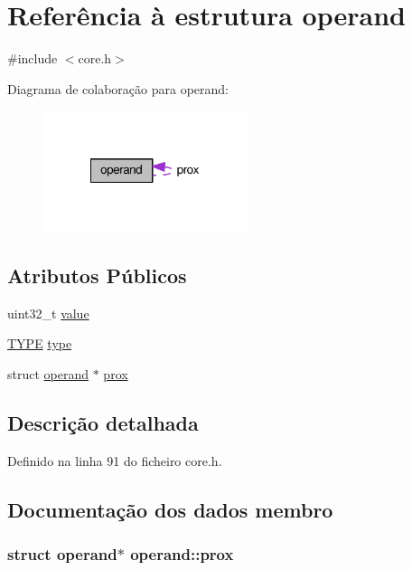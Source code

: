 \hypertarget{structoperand}{\section{Referência à estrutura operand}
\label{structoperand}
}


{\ttfamily \#include $<$core.\-h$>$}



Diagrama de colaboração para operand\-:\nopagebreak
\begin{figure}[H]
\begin{center}
\leavevmode
\includegraphics[width=170pt]{structoperand__coll__graph}
\end{center}
\end{figure}
\subsection*{Atributos Públicos}
\begin{DoxyCompactItemize}
\item 
uint32\-\_\-t \hyperlink{structoperand_a4112f16b41c272f45499c809391b17a2}{value}
\item 
\hyperlink{core_8h_a96376f31c362e2a289072478449290f8}{T\-Y\-P\-E} \hyperlink{structoperand_a8af3746223d14253f5b287d236f59ce4}{type}
\item 
struct \hyperlink{structoperand}{operand} $\ast$ \hyperlink{structoperand_a49e5a5dbe02eaa10b1a29b71106f9910}{prox}
\end{DoxyCompactItemize}


\subsection{Descrição detalhada}


Definido na linha 91 do ficheiro core.\-h.



\subsection{Documentação dos dados membro}
\hypertarget{structoperand_a49e5a5dbe02eaa10b1a29b71106f9910}{
\subsubsection[{prox}]{\setlength{\rightskip}{0pt plus 5cm}struct {\bf operand}$\ast$ operand\-::prox}}\label{structoperand_a49e5a5dbe02eaa10b1a29b71106f9910}


